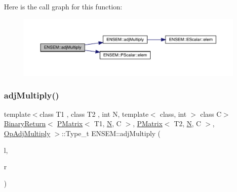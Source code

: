 Here is the call graph for this function\+:\nopagebreak
\begin{figure}[H]
\begin{center}
\leavevmode
\includegraphics[width=350pt]{df/d0a/group__primmatrix_ga01de3db0f09195f592339c9241bd4692_cgraph}
\end{center}
\end{figure}
\mbox{\label{group__primmatrix_gac28cbe7440b96e5650ac2c201b8c5ac2}} 
\subsubsection{\texorpdfstring{adjMultiply()}{adjMultiply()}\hspace{0.1cm}{\footnotesize\ttfamily [3/3]}}
{\footnotesize\ttfamily template$<$class T1 , class T2 , int N, template$<$ class, int $>$ class C$>$ \\
\mbox{\hyperlink{structENSEM_1_1BinaryReturn}{Binary\+Return}}$<$ \mbox{\hyperlink{classENSEM_1_1PMatrix}{P\+Matrix}}$<$ T1, \mbox{\hyperlink{adat__devel_2lib_2hadron_2operator__name__util_8cc_a7722c8ecbb62d99aee7ce68b1752f337}{N}}, C $>$, \mbox{\hyperlink{classENSEM_1_1PMatrix}{P\+Matrix}}$<$ T2, \mbox{\hyperlink{adat__devel_2lib_2hadron_2operator__name__util_8cc_a7722c8ecbb62d99aee7ce68b1752f337}{N}}, C $>$, \mbox{\hyperlink{structENSEM_1_1OpAdjMultiply}{Op\+Adj\+Multiply}} $>$\+::Type\+\_\+t E\+N\+S\+E\+M\+::adj\+Multiply (\begin{DoxyParamCaption}\item[{const \mbox{\hyperlink{classENSEM_1_1PMatrix}{P\+Matrix}}$<$ T1, \mbox{\hyperlink{adat__devel_2lib_2hadron_2operator__name__util_8cc_a7722c8ecbb62d99aee7ce68b1752f337}{N}}, C $>$ \&}]{l,  }\item[{const \mbox{\hyperlink{classENSEM_1_1PMatrix}{P\+Matrix}}$<$ T2, \mbox{\hyperlink{adat__devel_2lib_2hadron_2operator__name__util_8cc_a7722c8ecbb62d99aee7ce68b1752f337}{N}}, C $>$ \&}]{r }\end{DoxyParamCaption})\hspace{0.3cm}{\ttfamily [inline]}}

